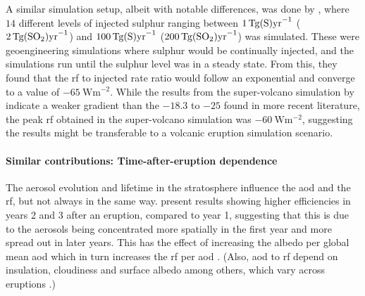 \documentclass{ametsocV5}
\begin{document}
A similar simulation setup, albeit with notable differences, was done by
\citet{niemeier2015}, where \(14\) different levels of injected sulphur ranging between
\(\SI{1}{\tera\gram(\ce{S})\mathrm{yr}^{-1}}\)
(\(\SI{2}{\tera\gram(\ce{SO2})\mathrm{yr}^{-1}}\)) and
\(\SI{100}{\tera\gram(\ce{S})\mathrm{yr}^{-1}}\)
(\(\SI{200}{\tera\gram(\ce{SO2})\mathrm{yr}^{-1}}\)) was simulated. These were
geoengineering simulations where sulphur would be continually injected, and the
simulations run until the sulphur level was in a steady state. From this, they found
that the \ac{rf} to injected rate ratio would follow an exponential and converge to a
value of \(\SI{-65}{\watt\metre^{-2}}\). While the results from the super-volcano
simulation by \citet{jones2005} indicate a weaker gradient than the \(-18.3\) to \(-25\)
found in more recent literature, the peak \ac{rf} obtained in the super-volcano
simulation was \(\SI{-60}{\watt\metre^{-2}}\), suggesting the \citet{niemeier2015}
results might be transferable to a volcanic eruption simulation scenario.

\paragraph*{Similar contributions: Time-after-eruption dependence}

The aerosol evolution and lifetime in the stratosphere influence the \ac{aod} and the
\ac{rf}, but not always in the same way. \citet{marshall2020} present results showing
higher efficiencies in years 2 and 3 after an eruption, compared to year 1, suggesting
that this is due to the aerosols being concentrated more spatially in the first year and
more spread out in later years. This has the effect of increasing the albedo per global
mean \ac{aod} which in turn increases the \ac{rf} per \ac{aod} \citep{marshall2020}.
(Also, \ac{aod} to \ac{rf} depend on insulation, cloudiness and surface albedo among
others, which vary across eruptions \citep{marshall2021,andersson2015}.)

\end{document}
